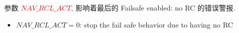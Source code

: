 参数 \textcolor{red}{$NAV\_RCL\_ACT$}, 影响着最后的 Failsafe enabled: no RC 的错误警报. 
\begin{itemize}
    \item $NAV\_RCL\_ACT=0$: stop the fail safe behavior due to having no RC
\end{itemize}